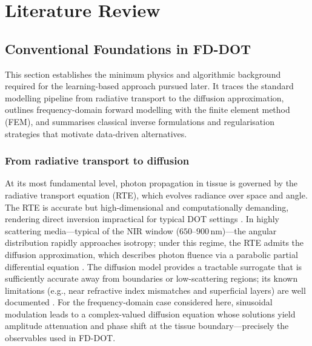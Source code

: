 \chapter{Literature Review}

\section{Conventional Foundations in FD-DOT}
This section establishes the minimum physics and algorithmic background required for the learning-based approach pursued later. It traces the standard modelling pipeline from radiative transport to the diffusion approximation, outlines frequency-domain forward modelling with the finite element method (FEM), and summarises classical inverse formulations and regularisation strategies that motivate data-driven alternatives.

\subsection{From radiative transport to diffusion}
At its most fundamental level, photon propagation in tissue is governed by the radiative transport equation (RTE), which evolves radiance over space and angle. The RTE is accurate but high-dimensional and computationally demanding, rendering direct inversion impractical for typical DOT settings \cite{arridge1999}. In highly scattering media—typical of the NIR window ($650$–$900$\,nm)—the angular distribution rapidly approaches isotropy; under this regime, the RTE admits the diffusion approximation, which describes photon fluence via a parabolic partial differential equation \cite{arridge1999, gibson2005, boas2001}. The diffusion model provides a tractable surrogate that is sufficiently accurate away from boundaries or low-scattering regions; its known limitations (e.g., near refractive index mismatches and superficial layers) are well documented \cite{arridge2009}. For the frequency-domain case considered here, sinusoidal modulation leads to a complex-valued diffusion equation whose solutions yield amplitude attenuation and phase shift at the tissue boundary—precisely the observables used in FD-DOT.

